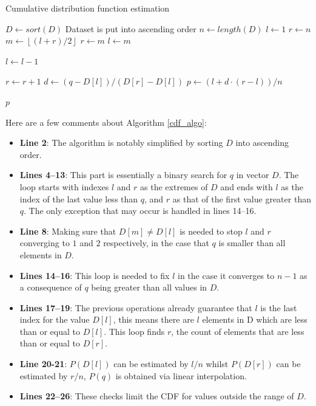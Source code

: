 \documentclass[10pt,final]{siamltex}
\begin{document}
\begin{algorithm}
  \caption{Cumulative distribution function estimation}
  \label{cdf_algo}
  \begin{algorithmic}[1]
    \State $D \gets sort(D)$
    \Comment Dataset is put into ascending order
    \State $n \gets length(D)$
    \State $l \gets 1$
    \State $r \gets n$
    \State $m \gets \left \lfloor{(l+r)/2}\right \rfloor$
    \State $r \gets m$
    \Else
    \State $l \gets m$
    \EndIf
    \EndWhile


    \State $l \gets l - 1$
    \EndWhile

    \State $r \gets r + 1$
    \EndWhile
    \State $d \gets (q-D[l])/(D[r]-D[l])$
    \State $p \gets (l + d \cdot (r - l))/n $

    \EndIf

    \State \Return $p$
    \EndFunction
  \end{algorithmic}
\end{algorithm}

Here are a few comments about Algorithm \ref{cdf_algo}:
\begin{itemize}
  \item \textbf{Line 2}: The algorithm is notably simplified by sorting $D$ into ascending order.
  \item \textbf{Lines 4--13}: This part is essentially a binary search for $q$ in vector $D$. The loop starts with indexes $l$ and $r$ as the extremes of $D$ and ends with $l$ as the index of the last value less than $q$, and $r$ as that of the first value greater than $q$. The only exception that may occur is handled in lines 14--16.
  \item \textbf{Line 8}: Making sure that $D[m]\neq D[l]$ is needed to stop $l$ and $r$ converging to $1$ and $2$ respectively, in the case that $q$ is smaller than all elements in $D$.
  \item \textbf{Lines 14--16}: This loop is needed to fix $l$ in the case it converges to $n-1$ as a consequence of $q$ being greater than all values in $D$.
  \item \textbf{Lines 17--19}: The previous operations already guarantee that $l$ is the last index for the value $D[l]$, this means there are $l$ elements in D which are less than or equal to $D[l]$. This loop finds $r$, the count of elements that are less than or equal to $D[r]$.
  \item \textbf{Line 20-21}: $P(D[l])$ can be estimated by $l/n$ whilst $P(D[r])$ can be estimated by $r/n$, $P(q)$ is obtained via linear interpolation.
  \item \textbf{Lines 22--26}: These checks limit the CDF for values outside the range of $D$.
\end{itemize}
%
\end{document}
